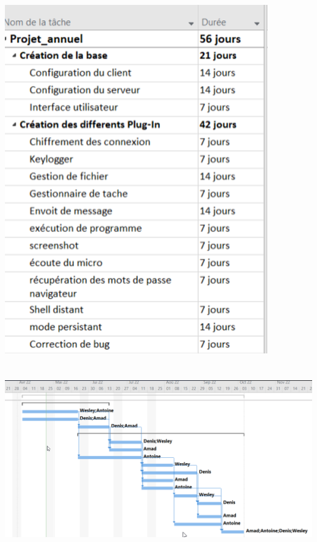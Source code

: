 \documentclass{beamer}
\begin{document}
\section{}
  \begin{frame}{}
	\includegraphics[scale=.5]{gaant1.png}
  \end{frame}

\section{}
  \begin{frame}{}
	\includegraphics[scale=.4]{gaant2.png}
  \end{frame}
\end{document}
